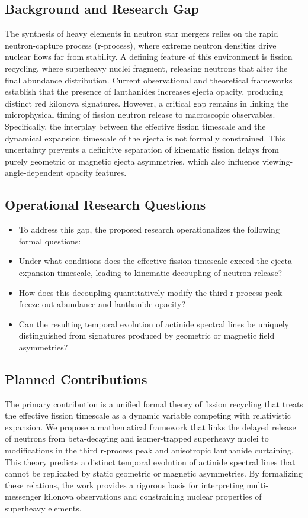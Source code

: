 \documentclass[conference]{IEEEtran}
\begin{document}
\subsection{Background and Research Gap}
The synthesis of heavy elements in neutron star mergers relies on the rapid neutron-capture process (r-process), where extreme neutron densities drive nuclear flows far from stability. A defining feature of this environment is fission recycling, where superheavy nuclei fragment, releasing neutrons that alter the final abundance distribution. Current observational and theoretical frameworks establish that the presence of lanthanides increases ejecta opacity, producing distinct red kilonova signatures. However, a critical gap remains in linking the microphysical timing of fission neutron release to macroscopic observables. Specifically, the interplay between the effective fission timescale and the dynamical expansion timescale of the ejecta is not formally constrained. This uncertainty prevents a definitive separation of kinematic fission delays from purely geometric or magnetic ejecta asymmetries, which also influence viewing-angle-dependent opacity features.~\cite{cite_30c88fe46f23448d}

\subsection{Operational Research Questions}
\begin{itemize}
\item To address this gap, the proposed research operationalizes the following formal questions:
\item Under what conditions does the effective fission timescale exceed the ejecta expansion timescale, leading to kinematic decoupling of neutron release?
\item How does this decoupling quantitatively modify the third r-process peak freeze-out abundance and lanthanide opacity?
\item Can the resulting temporal evolution of actinide spectral lines be uniquely distinguished from signatures produced by geometric or magnetic field asymmetries?
\end{itemize}

\subsection{Planned Contributions}
The primary contribution is a unified formal theory of fission recycling that treats the effective fission timescale as a dynamic variable competing with relativistic expansion. We propose a mathematical framework that links the delayed release of neutrons from beta-decaying and isomer-trapped superheavy nuclei to modifications in the third r-process peak and anisotropic lanthanide curtaining. This theory predicts a distinct temporal evolution of actinide spectral lines that cannot be replicated by static geometric or magnetic asymmetries. By formalizing these relations, the work provides a rigorous basis for interpreting multi-messenger kilonova observations and constraining nuclear properties of superheavy elements.
\end{document}
